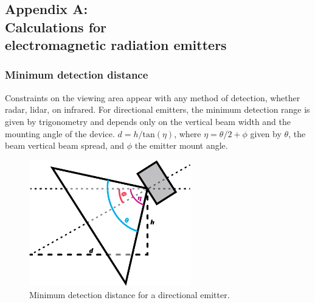 \subsection*{Appendix A:\\Calculations for\\electromagnetic radiation emitters} \label{app:AppendixA}
\subsubsection*{\label{sec:app:detection-principles}Minimum detection distance}
Constraints on the viewing area appear with any method of detection, whether radar, lidar, on infrared. For directional emitters, the minimum detection range is given by trigonometry and depends only on the vertical beam width and the mounting angle of the device. $d = h/\text{tan}(\eta)$, where $\eta=\theta/2+\phi$ given by $\theta$, the beam vertical beam spread, and $\phi$ the emitter mount angle.
\begin{figure}
\includegraphics[width=70mm,natwidth=505,natheight=394]{"./image/directional-emitters"}
\caption{\label{fig:emitter-angle}Minimum detection distance for a directional emitter.}
\end{figure}
